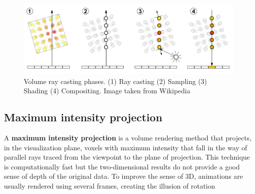 \begin{figure}[htb] %
   \centering
   \includegraphics[width=\linewidth]{images/Volume_ray_casting.png}
   \caption[Volume ray casting]{Volume ray casting phases. (1) Ray casting (2) Sampling (3) Shading (4) Compositing. Image taken from Wikipedia}
   \label{fig:volumeRayCasting}
\end{figure}

\subsection{Maximum intensity projection}

A \textbf{maximum intensity projection} is a volume rendering method that projects, in the visualization plane, voxels with maximum intensity that fall in the way of parallel rays traced from the viewpoint to the plane of projection. This technique is computationally fast but the two-dimensional results do not provide a good sense of depth of the original data. To improve the sense of 3D, animations are usually rendered using several frames, creating the illusion of rotation

